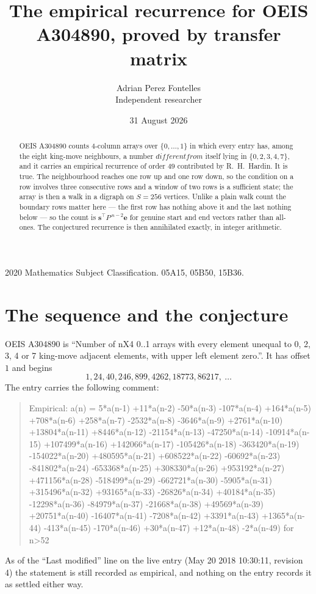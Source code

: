 \documentclass[11pt,a4paper]{article}
\title{The empirical recurrence for OEIS A304890, proved by transfer matrix}
\author{Adrian Perez Fontelles\\ \small Independent researcher}
\date{31 August 2026}
\theoremstyle{plain}
\theoremstyle{definition}
\begin{document}
\maketitle

\begin{abstract}
OEIS A304890 counts $4$-column arrays over $\{0,\dots,1\}$ in which every entry has,
among the eight king-move neighbours, a number $different from$ itself lying in $\{0,2,3,4,7\}$, and it carries an empirical
recurrence of order $49$ contributed by R.~H.~Hardin. It is true. The neighbourhood
reaches one row up and one row down, so the condition on a row involves three consecutive
rows and a window of two rows is a sufficient state; the array is then a walk in a digraph
on $S=256$ vertices. Unlike a plain walk count the boundary rows matter here --- the first
row has nothing above it and the last nothing below --- so the count is
$\mathbf{s}^{\!\top}P^{\,n-2}\mathbf{e}$ for genuine start and end vectors rather than
all-ones. The conjectured recurrence is then annihilated exactly, in integer arithmetic.
\end{abstract}

\noindent\small 2020 Mathematics Subject Classification. 05A15, 05B50, 15B36.\normalsize

\section{The sequence and the conjecture}

OEIS A304890 is ``Number of nX4 0..1 arrays with every element unequal to 0, 2, 3, 4 or 7 king-move adjacent elements, with upper left element zero.''. It has offset
$1$ and begins
\[
1, 24, 40, 246, 899, 4262, 18773, 86217,\ \dots
\]
The entry carries the following comment:
\begin{quote}\small
Empirical: a(n) = 5*a(n-1) +11*a(n-2) -50*a(n-3) -107*a(n-4) +164*a(n-5) +708*a(n-6) +258*a(n-7) -2532*a(n-8) -3646*a(n-9) +2761*a(n-10) +13804*a(n-11) +8446*a(n-12) -21154*a(n-13) -47250*a(n-14) -10914*a(n-15) +107499*a(n-16) +142066*a(n-17) -105426*a(n-18) -363420*a(n-19) -154022*a(n-20) +480595*a(n-21) +608522*a(n-22) -60692*a(n-23) -841802*a(n-24) -653368*a(n-25) +308330*a(n-26) +953192*a(n-27) +471156*a(n-28) -518499*a(n-29) -662721*a(n-30) -5905*a(n-31) +315496*a(n-32) +93165*a(n-33) -26826*a(n-34) +40184*a(n-35) -12298*a(n-36) -84979*a(n-37) -21668*a(n-38) +49569*a(n-39) +20751*a(n-40) -16407*a(n-41) -7208*a(n-42) +3391*a(n-43) +1365*a(n-44) -413*a(n-45) -170*a(n-46) +30*a(n-47) +12*a(n-48) -2*a(n-49) for n>52
\end{quote}
As of the ``Last modified'' line on the live entry (May 20 2018 10:30:11, revision
4) the statement is still recorded as empirical, and nothing on the entry
records it as settled either way.
\end{document}
